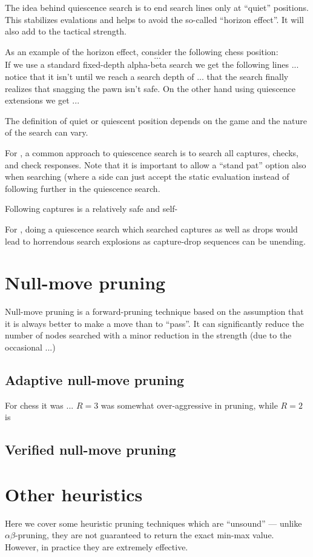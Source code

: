 \documentclass[10pt,dvipdfmx]{report}
\newcommand{\ab}{{$\alpha\beta$}}
\newcommand{\g}[1]{{\sc{#1}}\index{{\sc{#1}}}}
\begin{document}
The idea behind quiescence search is to end search lines only at ``quiet'' positions.
This stabilizes evalations and helps to avoid the so-called ``horizon effect''.
It will also add to the tactical strength.

As an example of the horizon effect, consider the following chess position:
\[ ... \]
If we use a standard fixed-depth alpha-beta search we get the following lines ...
notice that it isn't until we reach a search depth of ... that the search finally
realizes that snagging the pawn isn't safe.
On the other hand using quiescence extensions we get ...

The definition of quiet or quiescent position depends on the game and the nature
of the search can vary.

For \g{chess}, a common approach to quiescence search is
to search all captures, checks,
and check responses.  Note that it is important to allow a ``stand pat'' option also when
searching (where a side can just accept the static evaluation instead of following
further in the quiescence search.

Following captures is a relatively safe and self-


For \g{shogi}, doing a quiescence search which searched captures as well as drops would
lead to horrendous search explosions as capture-drop sequences can be unending.

\section{Null-move pruning}
Null-move pruning is a forward-pruning technique based on the assumption that it
is always better to make a move than to ``pass''.
It can significantly reduce the number of nodes searched with a minor reduction
in the strength (due to the occasional ...)

\subsection{Adaptive null-move pruning}
For chess it was ...
$R=3$ was somewhat over-aggressive in pruning,
while $R=2$ is

\subsection{Verified null-move pruning}

\section{Other heuristics}
Here we cover some heuristic pruning techniques which are ``unsound'' --- unlike
\ab-pruning, they are not guaranteed to return the exact min-max value.  However,
in practice they are extremely effective.
\end{document}
